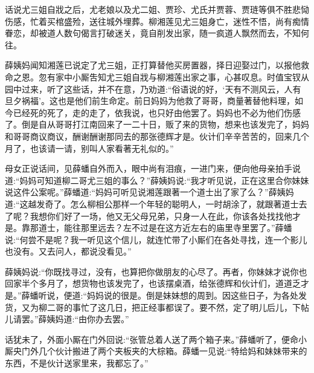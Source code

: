 
\begin{parag}
    话说尤三姐自戕之后，尤老娘以及尤二姐、贾珍、尤氏并贾蓉、贾琏等俱不胜悲恸伤感，忙着买棺盛殓，送往城外埋葬。柳湘莲见尤三姐身亡，迷性不悟，尚有痴情眷恋，却被道人数句偈言打破迷关，竟自削发出家，随一疯道人飘然而去，不知何往。
\end{parag}


\begin{parag}
    薛姨妈闻知湘莲已说定了尤三姐，正打算替他买房置器，择日迎娶过门，以报他救命之恩。忽有家中小厮吿知尤三姐自戕与柳湘莲出家之事，心甚叹息。时值宝钗从园中过来，听了这些话，并不在意，乃劝道:“俗语说的好，‘天有不测风云，人有旦夕祸福’。这也是他们前生命定。前日妈妈为他救了哥哥，商量著替他料理，如今已经死的死了，走的走了，依我说，也只好由他罢了。妈妈也不必为他们伤感了。倒是自从哥哥打江南回来了一二十日，贩了来的货物，想来也该发完了，妈妈和哥哥商议商议，酬谢酬谢那同去的那张德辉才是。伙计们辛辛苦苦的，回来几个月了，也该请一请，别叫人家看著无礼似的。”
\end{parag}


\begin{parag}
    母女正说话间，见薛蟠自外而入，眼中尚有泪痕，一进门来，便向他母亲拍手说道:“妈妈可知道柳二哥尤三姐的事么？”薛姨妈说:“我才听见说，正在这里合你妹妹说这件公案呢。”薛蟠道:“妈妈可听见说湘莲跟著一个道士出了家了么？”薛姨妈道:“这越发奇了。怎么柳相公那样一个年轻的聪明人，一时胡涂了，就跟著道士去了呢？我想你们好了一场，他又无父母兄弟，只身一人在此，你该各处找找他才是。靠那道士，能往那里远去？左不过是在这方近左右的庙里寺里罢了。”薛蟠说:“何尝不是呢？我一听见这个信儿，就连忙带了小厮们在各处寻找，连一个影儿也没有。又去问人，都说没看见。”
\end{parag}


\begin{parag}
    薛姨妈说:“你既找寻过，没有，也算把你做朋友的心尽了。再者，你妹妹才说你也回家半个多月了，想货物也该发完了，也该摆桌酒，给张德辉和伙计们，道道乏才是。”薛蟠听说，便道:“妈妈说的很是。倒是妹妹想的周到。因这些日子，为各处发货，又为柳二哥的事忙了这几日，把正经事都误了。要不然，定了明儿后儿，下帖儿请罢。”薛姨妈道:“由你办去罢。”
\end{parag}


\begin{parag}
    话犹未了，外面小厮在门外回说:“张管总着人送了两个箱子来。”薛蟠听了，便命小厮央门外几个伙计搬进了两个夹板夹的大棕箱。薛蟠一见说:“特给妈和妹妹带来的东西，不是伙计送家里来，我都忘了。”
\end{parag}


